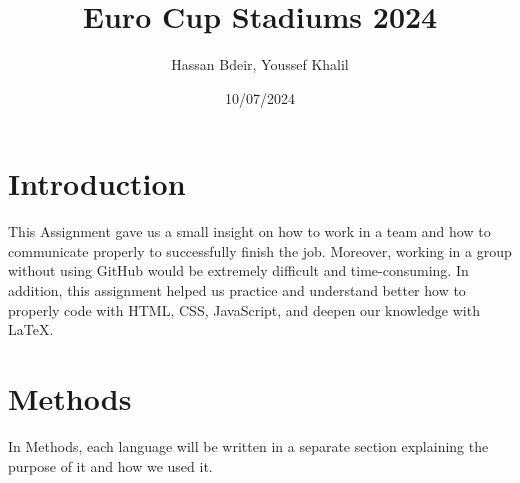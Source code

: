 \documentclass{article}
\title{Euro Cup Stadiums 2024}
\author{Hassan Bdeir, Youssef Khalil}
\date{10/07/2024}
\begin{document}
\maketitle

\section{Introduction}
\begin{justify}
    This Assignment gave us a small insight on how to work in a team and how to communicate properly to successfully finish the job. Moreover, working in a group without using GitHub would be extremely difficult and time-consuming. In addition, this assignment helped us practice and understand better how to properly code with HTML, CSS, JavaScript, and deepen our knowledge with LaTeX.
\end{justify}

\section{Methods}
\begin{justify}
    In Methods, each language will be written in a separate section explaining the purpose of it and how we used it.
\end{justify}
\end{document}
